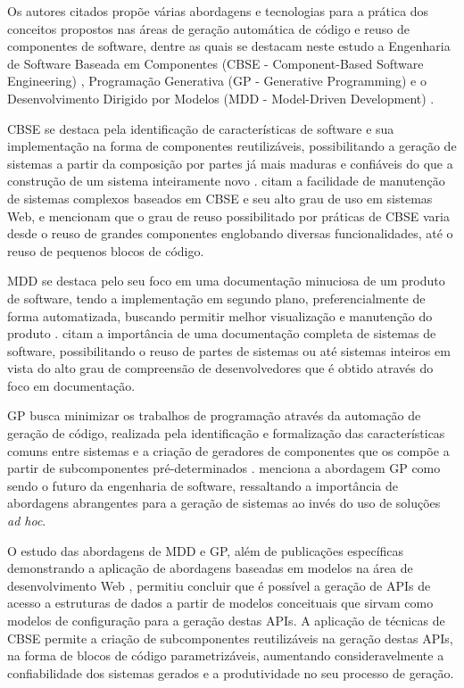 Os autores citados propõe várias abordagens e tecnologias para a prática dos conceitos propostos nas áreas de geração automática de código e reuso de componentes de software, dentre as quais se destacam neste estudo a Engenharia de Software Baseada em Componentes (CBSE - Component-Based Software Engineering) \cite{CRNKOVIC:2002a}, Programação Generativa (GP - Generative Programming) \cite{CZARNECKI:2000} e o Desenvolvimento Dirigido por Modelos (MDD - Model-Driven Development) \cite{STAHL:2006}.

CBSE se destaca pela identificação de características de software e sua implementação na forma de componentes reutilizáveis, possibilitando a geração de sistemas a partir da composição por partes já mais maduras e confiáveis do que a construção de um sistema inteiramente novo \cite{CRNKOVIC:2002a}.  citam a facilidade de manutenção de sistemas complexos baseados em CBSE e seu alto grau de uso em sistemas Web, e  mencionam que o grau de reuso possibilitado por práticas de CBSE varia desde o reuso de grandes componentes englobando diversas funcionalidades, até o reuso de pequenos blocos de código.

MDD se destaca pelo seu foco em uma documentação minuciosa de um produto de software, tendo a implementação em segundo plano, preferencialmente de forma automatizada, buscando permitir melhor visualização e manutenção do produto \cite{STAHL:2006}.  citam a importância de uma documentação completa de sistemas de software, possibilitando o reuso de partes de sistemas ou até sistemas inteiros em vista do alto grau de compreensão de desenvolvedores que é obtido através do foco em documentação.

GP busca minimizar os trabalhos de programação através da automação de geração de código, realizada pela identificação e formalização das características comuns entre sistemas e a criação de geradores de componentes que os compõe a partir de subcomponentes pré-determinados \cite{CZARNECKI:2000}.  menciona a abordagem GP como sendo o futuro da engenharia de software, ressaltando a importância de abordagens abrangentes para a geração de sistemas ao invés do uso de soluções \textit{ad hoc}.

O estudo das abordagens de MDD e GP, além de publicações específicas demonstrando a aplicação de abordagens baseadas em modelos na área de desenvolvimento Web \cite{POLAK:2015}\cite{VALVERDE:2009}, permitiu concluir que é possível a geração de APIs de acesso a estruturas de dados a partir de modelos conceituais que sirvam como modelos de configuração para a geração destas APIs. A aplicação de técnicas de CBSE permite a criação de subcomponentes reutilizáveis na geração destas APIs, na forma de blocos de código parametrizáveis, aumentando consideravelmente a confiabilidade dos sistemas gerados e a produtividade no seu processo de geração.

